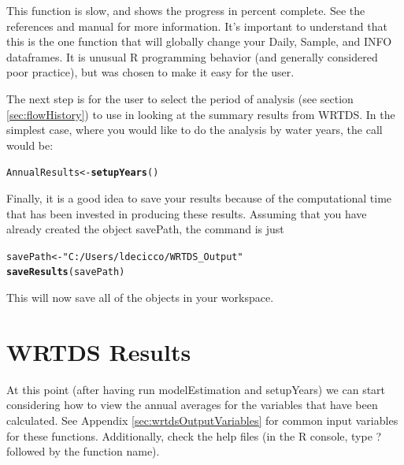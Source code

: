 \documentclass[a4paper,11pt]{article}\usepackage{graphicx, color}
\makeatletter
\newcommand{\hlfunctioncall}[1]{\textcolor[rgb]{0.501960784313725,0,0.329411764705882}{\textbf{#1}}}%
\newcommand{\hlstring}[1]{\textcolor[rgb]{0.6,0.6,1}{#1}}%
\newenvironment{kframe}{%
 \def\at@end@of@kframe{}%
 \ifinner\ifhmode%
  \def\at@end@of@kframe{\end{minipage}}%
  \begin{minipage}{\columnwidth}%
 \fi\fi%
 \def\FrameCommand##1{\hskip\@totalleftmargin \hskip-\fboxsep
 \colorbox{shadecolor}{##1}\hskip-\fboxsep
     \hskip-\linewidth \hskip-\@totalleftmargin \hskip\columnwidth}%
 \MakeFramed {\advance\hsize-\width
   \@totalleftmargin\z@ \linewidth\hsize
   \@setminipage}}%
 {\par\unskip\endMakeFramed%
 \at@end@of@kframe}
\newenvironment{knitrout}{}{} %
\makeatother
\begin{document}
This function is slow, and shows the progress in percent complete. See the references and manual for more information. It's important to understand that this is the one function that will globally change your Daily, Sample, and INFO dataframes. It is unusual R programming behavior (and generally considered poor practice), but was chosen to make it easy for the user.

The next step is for the user to select the period of analysis (see section \ref{sec:flowHistory}) to use in looking at the summary results from WRTDS. In the simplest case, where you would like to do the analysis by water years, the call would be:

\begin{knitrout}
\color{fgcolor}\begin{kframe}
\begin{alltt}
AnnualResults<-\hlfunctioncall{setupYears}()
\end{alltt}
\end{kframe}
\end{knitrout}


Finally, it is a good idea to save your results because of the computational time that has been invested in producing these results. Assuming that you have already created the object savePath, the command is just 

\begin{knitrout}
\color{fgcolor}\begin{kframe}
\begin{alltt}
savePath <- \hlstring{"C:/Users/ldecicco/WRTDS_Output"}
\hlfunctioncall{saveResults}(savePath) 
\end{alltt}
\end{kframe}
\end{knitrout}


This will now save all of the objects in your workspace.  
\FloatBarrier

\section{WRTDS Results}
\label{sec:wrtdsResults}
At this point (after having run modelEstimation and setupYears) we can start considering how to view the annual averages for the variables that have been calculated.  See Appendix \ref{sec:wrtdsOutputVariables} for common input variables for these functions. Additionally, check the help files (in the R console, type ? followed by the function name).
\end{document}
